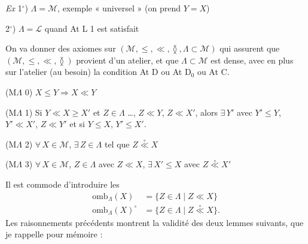 \documentclass[11pt,a4paper]{article}
\begin{document}
\emph{Ex} 1${}^{\circ}$) $\Lambda = \mathcal{M}$, exemple « universel » (on prend $Y = X$)

2${}^{\circ}$) $\Lambda = \mathcal{L}$ \struck{\ill{}} quand At L 1 est satisfait

On va donner des axiomes sur $(\mathcal{M}, \leq, \ll, \between, \Lambda \subset \mathcal{M})$ qui assurent que $(\mathcal{M}, \leq, \ll, \between)$ provient d'un atelier, et que $\Lambda \subset \mathcal{M}$ est dense, avec \struck{\ill{}} en plus sur l'atelier (au besoin) la condition At D ou At D$_0$ ou At C.

(M$\Lambda$ 0) \quad $X \leq Y \Longrightarrow X \ll Y$

(M$\Lambda$ 1) \quad Si  $Y \ll X \geq X'$ et \struck{\ill{}} $Z \in \Lambda$ \ldots, $Z \ll Y$, $Z \ll X'$, \struck{\ill{}} alors $\exists\, Y'$ avec   $Y' \leq Y$, $Y' \ll X'$, $Z \ll Y'$ et si $Y \leq X$, $Y' \leq X'$.

(M$\Lambda$ 2) \quad $\forall\, X \in \mathcal{M}$, $\exists\, Z \in \Lambda$ tel que $Z \mathrel{\overset{\circ}{\ll}} X$

(M$\Lambda$ 3) \quad $\forall\, X \in \mathcal{M}$, $Z \in \Lambda$ avec $Z \ll X$, $\exists\, X' \leq X$ avec $Z \mathrel{\overset{\circ}{\ll}} X'$

 Il est commode d'introduire les
\[
  \begin{aligned}
    \mathrm{omb}_{\Lambda}(X) &= \lbrace Z \in \Lambda \mid Z \ll X \rbrace \\
    \mathrm{omb}_{\Lambda}(X)^{\circ} &= \lbrace Z \in \Lambda \mid Z \mathrel{\overset{\circ}{\ll}} X \rbrace .
  \end{aligned}
\]
Les raisonnements précédents montrent la validité des deux lemmes suivants, que je rappelle pour mémoire :
\end{document}

